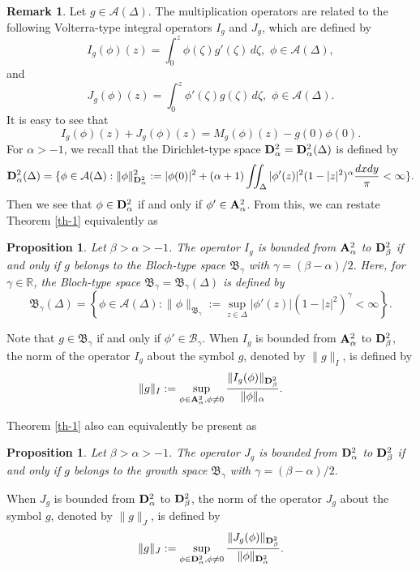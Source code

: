 \documentclass[10pt]{amsart}
\newtheorem{proposition}[theorem]{Proposition}
\theoremstyle{definition}    %
\newtheorem{remark}[theorem]{Remark}
\numberwithin{equation}{section}
\begin{document}
\begin{remark}Let $g\in \mathcal{A}(\Delta)$. The multiplication operators are related to the following Volterra-type integral operators $I_g$ and $J_g$, which are defined by
$$
I_{g}(\phi)(z) = \int_{0}^{z}\phi(\zeta)g'(\zeta)\,d\zeta,\,\, \phi\in \mathcal{A}(\Delta),$$
and$$
J_{g}(\phi)(z) = \int_{0}^{z}\phi'(\zeta)g(\zeta)\,d\zeta,\,\, \phi\in \mathcal{A}(\Delta).
$$
It is easy to see that 
$$
I_{g}(\phi)(z) + J_{g}(\phi)(z) = M_{g}(\phi)(z) - g(0)\phi(0).
$$
For $\alpha>-1$, we recall that the Dirichlet-type space ${\bf{D}}_{\alpha}^2={\bf{D}}_{\alpha}^2(\Delta)$ is defined by
$${\bf D}_{\alpha}^2(\Delta)=\{\phi \in \mathcal{A}(\Delta) : \|\phi\|_{{\bf D}_{\alpha}^2}^2:=|\phi(0)|^2+(\alpha+1)\iint_{\Delta}|\phi'(z)|^2(1-|z|^2)^{\alpha}\frac{dxdy}{\pi}<\infty\}.$$
Then we see that $\phi \in {\bf D}_{\alpha}^2$ if and only if $\phi' \in {\bf A}_{\alpha}^2$. 
From this, we can restate Theorem \ref{th-1} equivalently as
\begin{proposition}\label{pr-1}Let $\beta>\alpha>-1$. 
The operator $I_g$ is bounded from ${\bf A}_{\alpha}^2$ to ${\bf D}_{\beta}^2$ if and only if $g$ belongs to the Bloch-type space $\mathfrak{B}_{\gamma}$ with $\gamma=(\beta-\alpha)/2.$ 
Here, for $\gamma \in \mathbb{R}$, the Bloch-type space $\mathfrak{B}_{\gamma}=\mathfrak{B}_{\gamma}(\Delta)$ is defined by
$$
\mathfrak{B}_{\gamma}(\Delta)=\left\{ \phi \in \mathcal{A}(\Delta) : 
\|\phi\|_{\mathfrak{B}_{\gamma}}:=\sup_{z\in \Delta}|\phi'(z)|(1-|z|^2)^{\gamma}<\infty \right\}.
$$
\end{proposition}Note that $g\in \mathfrak{B}_{\gamma}$ if and only if $\phi'\in \mathcal{B}_{\gamma}$. When $I_g$ is bounded from ${\bf A}_{\alpha}^2$ to ${\bf D}_{\beta}^2$,  the norm of the operator $I_g$ about the symbol $g$, denoted by $\|g\|_{I}$, is defined by
$$
\|g\|_{I}:=\sup_{\phi \in {\bf A}^{2}_{\alpha}, \phi \neq 0} \frac{\|I_g(\phi)\|_{{\bf D}_{\beta}^2}}{\|\phi\|_{\alpha}}.
$$ 

Theorem \ref{th-1} also can equivalently be present as 
\begin{proposition}\label{pr-2}Let $\beta>\alpha>-1$. 
The operator $J_g$ is bounded from ${\bf D}_{\alpha}^2$ to ${\bf D}_{\beta}^2$ if and only if $g$ belongs to the growth space $\mathfrak{B}_{\gamma}$ with $\gamma=(\beta-\alpha)/2.$ 
\end{proposition}
When $J_g$ is bounded from ${\bf D}_{\alpha}^2$ to ${\bf D}_{\beta}^2$,  the norm of the operator $J_g$ about the symbol $g$, denoted by $\|g\|_{J}$, is defined by
$$
\|g\|_{J}:=\sup_{\phi \in {\bf D}^{2}_{\alpha}, \phi \neq 0}\frac{\|J_g(\phi)\|_{{\bf D}_{\beta}^2}}{\|\phi\|_{{\bf D}_{\alpha}^2}}.
$$ 


\end{remark}
\end{document}

